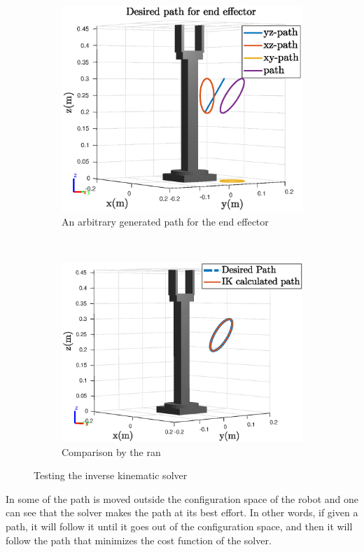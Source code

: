 \begin{figure}[htbp]
    \centering
    \begin{subfigure}[htbp]{0.48\textwidth}
        \centering
        \includegraphics[width = \picsSiz\linewidth]{img/pathRob.eps}
        \caption{An arbitrary generated path for the end effector}
        \label{fig:oath}
    \end{subfigure}
    ~ 
    \begin{subfigure}[htbp]{0.48\textwidth}
        \centering
        \includegraphics[width = \picsSiz\linewidth]{img/compIK.eps}
        \caption{Comparison by the ran}
        \label{fig:compa}
    \end{subfigure}
    \caption{Testing the inverse kinematic solver}
    \label{fig:IKcom}
\end{figure}
In  some of the path is moved outside the configuration space of the robot and one can see that the solver makes the path at its best effort. In other words, if given a path, it will follow it until it goes out of the configuration space, and then it will follow the path that minimizes the cost function of the solver. 


